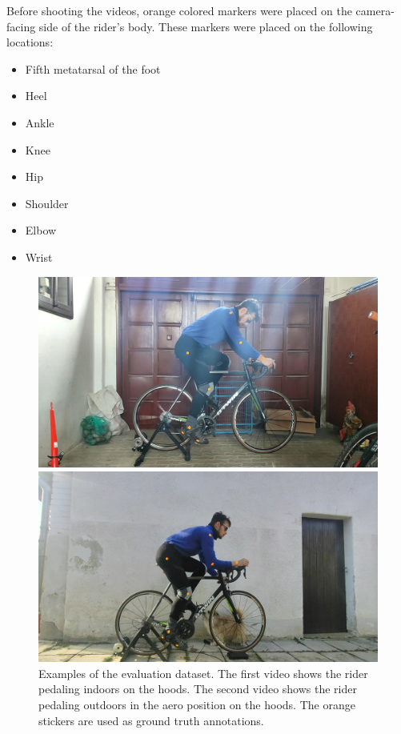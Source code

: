 Before shooting the videos, orange colored markers were placed on the camera-facing side of the rider's body. These markers were placed on the following locations:

\begin{itemize}
    \item Fifth metatarsal of the foot
    \item Heel
    \item Ankle
    \item Knee
    \item Hip
    \item Shoulder
    \item Elbow
    \item Wrist
\end{itemize}

\begin{figure}[htbp]

    \centering
    \includegraphics[width=1\linewidth]{obrazky-figures/eval_dataset_in_hoods.png}

    \includegraphics[width=1\linewidth]{obrazky-figures/eval_dataset_out_aero.png}

    \caption{Examples of the evaluation dataset. The first video shows the rider pedaling indoors on the hoods. The second video shows the rider pedaling outdoors in the aero position on the hoods. The orange stickers are used as ground truth annotations.}


    \label{fig:evaluation_markers}
\end{figure}

